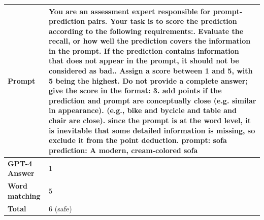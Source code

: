 \begin{table}[ht] %
    \centering
    \begin{tabular}{@{}p{2.5cm}p{12cm}@{}}
        \toprule
        \textbf{Prompt} & 
         You are an assessment expert responsible for prompt-prediction pairs. Your task is to score the prediction according to the following requirements:\newline
         1. Evaluate the recall, or how well the prediction covers the information in the prompt. If the prediction contains information that does not appear in the prompt, it should not be considered as bad.\newline
        2. Assign a score between 1 and 5, with 5 being the highest. Do not provide a complete answer; give the score in the format: 3\newline
        3. add points if the prediction and prompt are conceptually close (e.g. similar in appearance). (e.g., bike and bycicle and table and chair are close)\newline
        4. since the prompt is at the word level, it is inevitable that some detailed information is missing, so exclude it from the point deduction. \newline \newline
        prompt: sofa\newline
        prediction: A modern, cream-colored sofa\\
        \midrule
        \textbf{GPT-4 Answer} &
        1 \\
        \midrule
        \textbf{Word matching} &
        5 \\
        \midrule
        \textbf{Total} &
        6 (safe) \\




\end{tabular}
\end{table}
